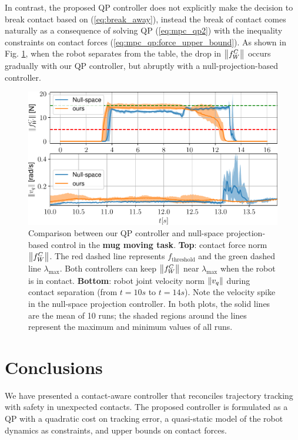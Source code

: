 In contrast, the proposed QP controller does not explicitly make the decision to break contact based on (\ref{eq:break_away}), instead the break of contact comes naturally as a consequence of solving QP (\ref{eq:mpc_qp2}) with the inequality constraints on contact forces (\ref{eq:mpc_qp:force_upper_bound}). As shown in Fig. \ref{fig:jorda_vs_ours}, when the robot separates from the table, the drop in $\left\lVert{f_W^C}\right\rVert$ occurs gradually with our QP controller, but abruptly with a null-projection-based controller.
\begin{figure}[h]
\vspace{-0.2cm}
\centering
\includegraphics[width=0.98\linewidth]{figures/04_control/ours_vs_jorda.pdf}
\caption{Comparison between our QP controller and null-space projection-based control in the \textbf{mug moving task}. \textbf{Top}: contact force norm $\left\lVert{f_W^C}\right\rVert$. The red dashed line represents $f_\text{threshold}$ and the green dashed line $\lambda_\text{max}$. Both controllers can keep $\left\lVert{f_W^C}\right\rVert$ near $\lambda_\text{max}$ when the robot is in contact. \textbf{Bottom}: robot joint velocity norm $\left\lVert{v_q}\right\rVert$ during contact separation (from $t=10s$ to $t=14s$). Note the velocity spike in the null-space projection controller. In both plots, the solid lines are the mean of 10 runs; the shaded regions around the lines represent the maximum and minimum values of all runs.}
\label{fig:jorda_vs_ours}
\vspace{-0.7cm}
\end{figure}


\section{Conclusions}
We have presented a contact-aware controller that reconciles trajectory tracking with safety in unexpected contacts. The proposed controller is formulated as a QP with a quadratic cost on tracking error, a quasi-static model of the robot dynamics as constraints, and upper bounds on contact forces.

